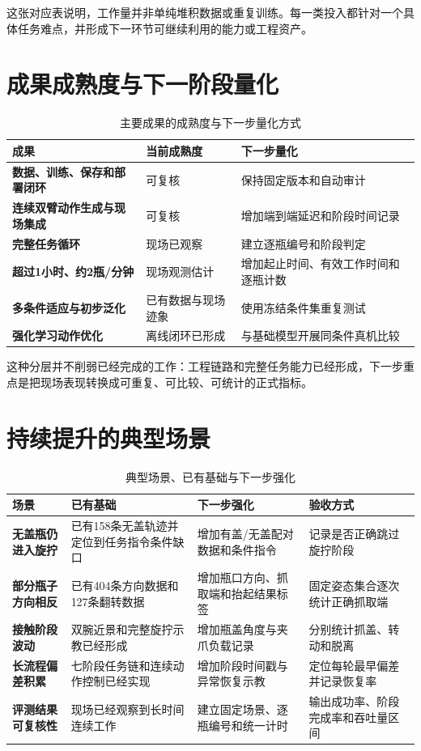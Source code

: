 这张对应表说明，工作量并非单纯堆积数据或重复训练。每一类投入都针对一个具体任务难点，并形成下一环节可继续利用的能力或工程资产。

\section{成果成熟度与下一阶段量化}

\begin{table}[H]
\centering
\caption{主要成果的成熟度与下一步量化方式}
\begin{tabularx}{\textwidth}{>{\bfseries}p{48mm}p{27mm}X}
\toprule
成果 & 当前成熟度 & 下一步量化\\
\midrule
数据、训练、保存和部署闭环 & 可复核 & 保持固定版本和自动审计\\
连续双臂动作生成与现场集成 & 可复核 & 增加端到端延迟和阶段时间记录\\
完整任务循环 & 现场已观察 & 建立逐瓶编号和阶段判定\\
超过1小时、约2瓶/分钟 & 现场观测估计 & 增加起止时间、有效工作时间和逐瓶计数\\
多条件适应与初步泛化 & 已有数据与现场迹象 & 使用冻结条件集重复测试\\
强化学习动作优化 & 离线闭环已形成 & 与基础模型开展同条件真机比较\\
\bottomrule
\end{tabularx}
\end{table}

这种分层并不削弱已经完成的工作：工程链路和完整任务能力已经形成，下一步重点是把现场表现转换成可重复、可比较、可统计的正式指标。

\section{持续提升的典型场景}

\begin{table}[H]
\centering
\caption{典型场景、已有基础与下一步强化}
\begin{tabularx}{\textwidth}{>{\bfseries}p{28mm}p{47mm}p{45mm}X}
\toprule
场景 & 已有基础 & 下一步强化 & 验收方式\\
\midrule
无盖瓶仍进入旋拧 & 已有158条无盖轨迹并定位到任务指令条件缺口 & 增加有盖/无盖配对数据和条件指令 & 记录是否正确跳过旋拧阶段\\
部分瓶子方向相反 & 已有404条方向数据和127条翻转数据 & 增加瓶口方向、抓取端和抬起结果标签 & 固定姿态集合逐次统计正确抓取端\\
接触阶段波动 & 双腕近景和完整旋拧示教已经形成 & 增加瓶盖角度与夹爪负载记录 & 分别统计抓盖、转动和脱离\\
长流程偏差积累 & 七阶段任务链和连续动作控制已经实现 & 增加阶段时间戳与异常恢复示教 & 定位每轮最早偏差并记录恢复率\\
评测结果可复核性 & 现场已经观察到长时间连续工作 & 建立固定场景、逐瓶编号和统一计时 & 输出成功率、阶段完成率和吞吐量区间\\
\bottomrule
\end{tabularx}
\end{table}

